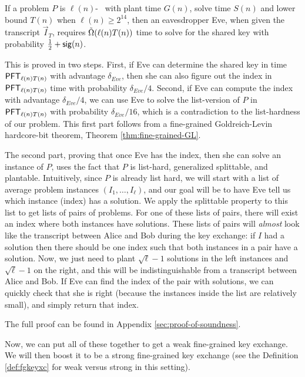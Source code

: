 \begin{lemma}\label{lem:eve-time}
	If a problem $P$ is $\ell(n)$-\keyER~ with plant time $G(n)$, solve time $S(n)$ and lower bound $T(n)$ when $\ell(n)\ge 2^{14}$,
	then an eavesdropper Eve, when given the transcript $\vec I_T$, requires $\~\Omega(\ell(n) T(n))$ time to solve for the shared key with probability $\frac{1}{2}+\sig(n)$.
\end{lemma}
\begin{proof-sketch}
	This is proved in two steps. First, if Eve can determine the shared key in time $\PFT{\ell(n)T(n)}$ with advantage $\delta_{Eve}$, then she can also figure out the index in $\PFT{\ell(n)T(n)}$ time with probability $\delta_{Eve}/4$. Second, if Eve can compute the index with advantage $\delta_{Eve}/4$, we can use Eve to solve the list-version of $P$ in $\PFT{\ell(n)T(n)}$ with probability $\delta_{Eve}/16$, which is a contradiction to the list-hardness of our problem. This first part follows from a fine-grained Goldreich-Levin hardcore-bit theorem, Theorem \ref{thm:fine-grained-GL}.
	
	The second part, proving that once Eve has the index, then she can solve an instance of $P$, uses the fact that $P$ is list-hard, generalized splittable, and plantable. Intuitively, since $P$ is already list hard, we will start with a list of average problem instances $(I_1, \ldots, I_{\ell})$, and our goal will be to have Eve tell us which instance (index) has a solution. We apply the splittable property to this list to get lists of pairs of problems. For one of these lists of pairs, there will exist an index where both instances have solutions. These lists of pairs will \emph{almost} look like the transcript between Alice and Bob during the key exchange: if $I$ had a solution then there should be one index such that both instances in a pair have a solution. Now, we just need to plant $\sqrt{\ell} - 1$ solutions in the left instances and $\sqrt{\ell} - 1$ on the right, and this will be indistinguishable from a transcript between Alice and Bob. If Eve can find the index of the pair with solutions, we can quickly check that she is right (because the instances inside the list are relatively small), and simply return that index.
	
	The full proof can be found in Appendix \ref{sec:proof-of-soundness}.
\end{proof-sketch}

Now, we can put all of these together to get a weak fine-grained key exchange. We will then boost it to be a strong fine-grained key exchange (see the Definition \ref{def:fgkeyxc} for weak versus strong in this setting).

